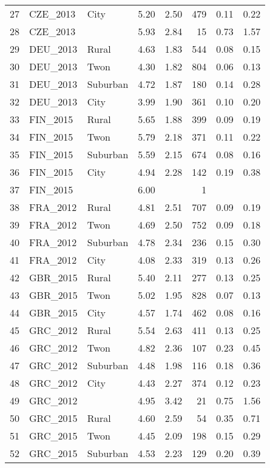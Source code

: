 \documentclass[12pt, titlepage]{article}
\begin{document}
\begin{longtable}[H]{rllrrrrr}
		27 & CZE\_2013 & City & 5.20 & 2.50 & 479 & 0.11 & 0.22 \\ 
		28 & CZE\_2013 &  & 5.93 & 2.84 &  15 & 0.73 & 1.57 \\ 
		29 & DEU\_2013 & Rural & 4.63 & 1.83 & 544 & 0.08 & 0.15 \\ 
		30 & DEU\_2013 & Twon & 4.30 & 1.82 & 804 & 0.06 & 0.13 \\ 
		31 & DEU\_2013 & Suburban & 4.72 & 1.87 & 180 & 0.14 & 0.28 \\ 
		32 & DEU\_2013 & City & 3.99 & 1.90 & 361 & 0.10 & 0.20 \\ 
		33 & FIN\_2015 & Rural & 5.65 & 1.88 & 399 & 0.09 & 0.19 \\ 
		34 & FIN\_2015 & Twon & 5.79 & 2.18 & 371 & 0.11 & 0.22 \\ 
		35 & FIN\_2015 & Suburban & 5.59 & 2.15 & 674 & 0.08 & 0.16 \\ 
		36 & FIN\_2015 & City & 4.94 & 2.28 & 142 & 0.19 & 0.38 \\ 
		37 & FIN\_2015 &  & 6.00 &  &   1 &  &  \\ 
		38 & FRA\_2012 & Rural & 4.81 & 2.51 & 707 & 0.09 & 0.19 \\ 
		39 & FRA\_2012 & Twon & 4.69 & 2.50 & 752 & 0.09 & 0.18 \\ 
		40 & FRA\_2012 & Suburban & 4.78 & 2.34 & 236 & 0.15 & 0.30 \\ 
		41 & FRA\_2012 & City & 4.08 & 2.33 & 319 & 0.13 & 0.26 \\ 
		42 & GBR\_2015 & Rural & 5.40 & 2.11 & 277 & 0.13 & 0.25 \\ 
		43 & GBR\_2015 & Twon & 5.02 & 1.95 & 828 & 0.07 & 0.13 \\ 
		44 & GBR\_2015 & City & 4.57 & 1.74 & 462 & 0.08 & 0.16 \\ 
		45 & GRC\_2012 & Rural & 5.54 & 2.63 & 411 & 0.13 & 0.25 \\ 
		46 & GRC\_2012 & Twon & 4.82 & 2.36 & 107 & 0.23 & 0.45 \\ 
		47 & GRC\_2012 & Suburban & 4.48 & 1.98 & 116 & 0.18 & 0.36 \\ 
		48 & GRC\_2012 & City & 4.43 & 2.27 & 374 & 0.12 & 0.23 \\ 
		49 & GRC\_2012 &  & 4.95 & 3.42 &  21 & 0.75 & 1.56 \\ 
		50 & GRC\_2015 & Rural & 4.60 & 2.59 &  54 & 0.35 & 0.71 \\ 
		51 & GRC\_2015 & Twon & 4.45 & 2.09 & 198 & 0.15 & 0.29 \\ 
		52 & GRC\_2015 & Suburban & 4.53 & 2.23 & 129 & 0.20 & 0.39 \\ 

\end{longtable}
\end{document}

